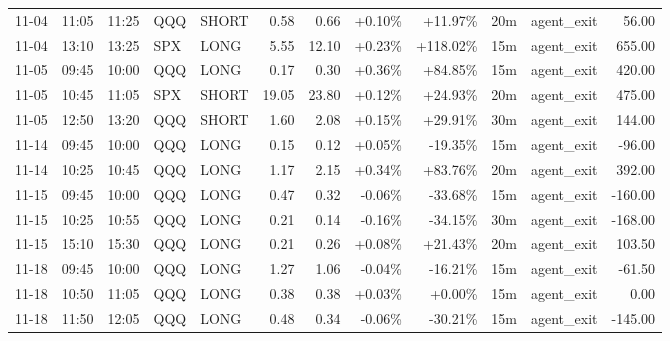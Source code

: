 \documentclass[11pt,a4paper]{article}
\begin{document}
\begin{center}
\begin{longtable}{>{\color{txtmain}}l l l l l r r r r r >{\color{txtmain}}l r}
11-04 & 11:05 & 11:25 & QQQ & SHORT & 0.58 & 0.66 & \textcolor{wingreen}{+0.10\%} & \textcolor{wingreen}{+11.97\%} & 20m & agent\_exit & \textcolor{wingreen}{56.00} \\
11-04 & 13:10 & 13:25 & SPX & LONG & 5.55 & 12.10 & \textcolor{wingreen}{+0.23\%} & \textcolor{wingreen}{+118.02\%} & 15m & agent\_exit & \textcolor{wingreen}{655.00} \\
11-05 & 09:45 & 10:00 & QQQ & LONG & 0.17 & 0.30 & \textcolor{wingreen}{+0.36\%} & \textcolor{wingreen}{+84.85\%} & 15m & agent\_exit & \textcolor{wingreen}{420.00} \\
11-05 & 10:45 & 11:05 & SPX & SHORT & 19.05 & 23.80 & \textcolor{wingreen}{+0.12\%} & \textcolor{wingreen}{+24.93\%} & 20m & agent\_exit & \textcolor{wingreen}{475.00} \\
11-05 & 12:50 & 13:20 & QQQ & SHORT & 1.60 & 2.08 & \textcolor{wingreen}{+0.15\%} & \textcolor{wingreen}{+29.91\%} & 30m & agent\_exit & \textcolor{wingreen}{144.00} \\
11-14 & 09:45 & 10:00 & QQQ & LONG & 0.15 & 0.12 & \textcolor{wingreen}{+0.05\%} & \textcolor{lossred}{-19.35\%} & 15m & agent\_exit & \textcolor{lossred}{-96.00} \\
11-14 & 10:25 & 10:45 & QQQ & LONG & 1.17 & 2.15 & \textcolor{wingreen}{+0.34\%} & \textcolor{wingreen}{+83.76\%} & 20m & agent\_exit & \textcolor{wingreen}{392.00} \\
11-15 & 09:45 & 10:00 & QQQ & LONG & 0.47 & 0.32 & \textcolor{lossred}{-0.06\%} & \textcolor{lossred}{-33.68\%} & 15m & agent\_exit & \textcolor{lossred}{-160.00} \\
11-15 & 10:25 & 10:55 & QQQ & LONG & 0.21 & 0.14 & \textcolor{lossred}{-0.16\%} & \textcolor{lossred}{-34.15\%} & 30m & agent\_exit & \textcolor{lossred}{-168.00} \\
11-15 & 15:10 & 15:30 & QQQ & LONG & 0.21 & 0.26 & \textcolor{wingreen}{+0.08\%} & \textcolor{wingreen}{+21.43\%} & 20m & agent\_exit & \textcolor{wingreen}{103.50} \\
11-18 & 09:45 & 10:00 & QQQ & LONG & 1.27 & 1.06 & \textcolor{lossred}{-0.04\%} & \textcolor{lossred}{-16.21\%} & 15m & agent\_exit & \textcolor{lossred}{-61.50} \\
11-18 & 10:50 & 11:05 & QQQ & LONG & 0.38 & 0.38 & \textcolor{wingreen}{+0.03\%} & \textcolor{wingreen}{+0.00\%} & 15m & agent\_exit & \textcolor{wingreen}{0.00} \\
11-18 & 11:50 & 12:05 & QQQ & LONG & 0.48 & 0.34 & \textcolor{lossred}{-0.06\%} & \textcolor{lossred}{-30.21\%} & 15m & agent\_exit & \textcolor{lossred}{-145.00} \\

\end{longtable}
\end{center}
\end{document}
